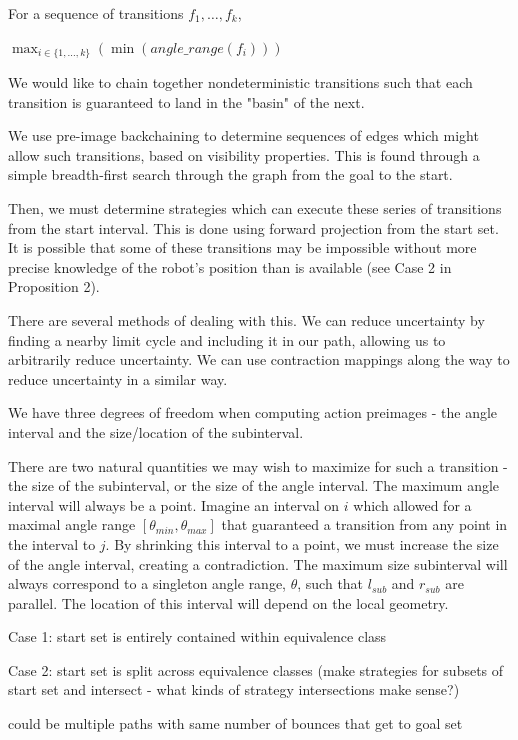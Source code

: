 \documentclass[]{svproc}  %
\begin{document}
For a sequence of transitions $f_1, \ldots, f_k$,

$\max_{i \in \{1,\ldots, k\}}( \min(angle\_range(f_i) ))$


We would like to chain together nondeterministic transitions such that each
transition is guaranteed to land in the "basin" of the next.

We use pre-image backchaining to determine sequences of edges which might allow
such transitions, based on visibility properties. This is found through a simple
breadth-first search through the graph from the goal to the start.

Then, we must determine strategies which can execute these series of transitions
from the start interval. This is done using forward projection from the start
set. It is possible that some of these transitions may be impossible without
more precise knowledge of the robot's position than is available (see Case 2 in
Proposition 2).

There are several methods of dealing with this. We can reduce uncertainty by
finding a nearby limit cycle and including it in our path, allowing us to
arbitrarily reduce uncertainty. We can use
contraction mappings along the way to reduce uncertainty in a similar way.

We have three degrees of freedom when computing action preimages - the angle
interval and the size/location of the subinterval.

There are two natural quantities we may wish to maximize for such a transition -
the size of the subinterval, or the size of the angle interval.
The maximum angle interval will always be a point. Imagine an interval on $i$
which allowed for a maximal angle range $[\theta_{min}, \theta_{max}]$ that
guaranteed a transition from any point in the interval to $j$. By
shrinking this interval to a point, we must increase the size of the angle
interval, creating a contradiction. The maximum size subinterval will always correspond to a singleton angle range,
$\theta$, such that $l_{sub}$ and $r_{sub}$ are parallel. The location of this
interval will depend on the local geometry.

Case 1: start set is entirely contained within equivalence class

Case 2: start set is split across equivalence classes (make strategies for
subsets of start set and intersect - what kinds of strategy intersections make
sense?)

could be multiple paths with same number of bounces that get to goal set
\end{document}
